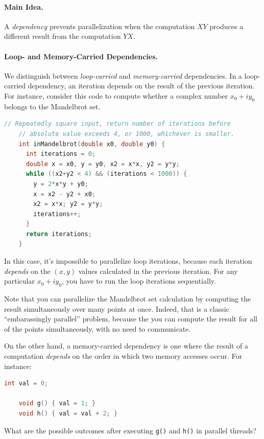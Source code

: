 \documentclass[a4paper]{report}
\begin{document}
\paragraph{Main Idea.} A \emph{dependency} prevents parallelization
when the computation $XY$ produces a different result from the
computation $YX$.

\paragraph{Loop- and Memory-Carried Dependencies.} We distinguish
between \emph{loop-carried} and \emph{memory-carried} dependencies.
In a loop-carried dependency, an iteration depends on the result of
the previous iteration. For instance, consider this code to
compute whether a complex number $x_0 + iy_0$ belongs to the Mandelbrot
set.

{\small \begin{lstlisting}[language=C]
    // Repeatedly square input, return number of iterations before 
    // absolute value exceeds 4, or 1000, whichever is smaller.
    int inMandelbrot(double x0, double y0) {
      int iterations = 0;
      double x = x0, y = y0, x2 = x*x, y2 = y*y;
      while ((x2+y2 < 4) && (iterations < 1000)) {
        y = 2*x*y + y0;
        x = x2 - y2 + x0;
        x2 = x*x; y2 = y*y;
        iterations++;
      }
      return iterations;
    }
\end{lstlisting} }
In this case, it's impossible to parallelize loop iterations, because
each iteration \emph{depends} on the $(x, y)$ values calculated in the
previous iteration. For any particular $x_0 + iy_0$, you have to run the
loop iterations sequentially.

Note that you can parallelize the Mandelbrot set calculation
by computing the result simultaneously over many points at
once. Indeed, that is a classic ``embarassingly parallel'' problem,
because the you can compute the result for all of the points
simultaneously, with no need to communicate.

On the other hand, a memory-carried dependency is one where the result
of a computation \emph{depends} on the order in which two memory accesses
occur. For instance:

{\small \begin{lstlisting}[language=C]
    int val = 0;

    void g() { val = 1; }
    void h() { val = val + 2; }
\end{lstlisting} }

{\sf What are the possible outcomes after executing {\tt g()} and {\tt h()}
in parallel threads?} \\[1em]
\end{document}
